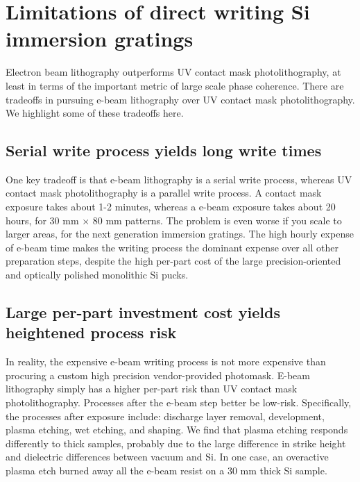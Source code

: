 \section{Limitations of direct writing Si immersion gratings}
Electron beam lithography outperforms UV contact mask photolithography, at least in terms of the important metric of large scale phase coherence.  There are tradeoffs in pursuing e-beam lithography over UV contact mask photolithography.  We highlight some of these tradeoffs here.

\subsection{Serial write process yields long write times}
One key tradeoff is that e-beam lithography is a serial write process, whereas UV contact mask photolithography is a parallel write process.  A contact mask exposure takes about 1-2 minutes, whereas a e-beam exposure takes about 20 hours, for 30 mm $\times$ 80 mm patterns.  The problem is even worse if you scale to larger areas, for the next generation immersion gratings.  The high hourly expense of e-beam time makes the writing process the dominant expense over all other preparation steps, despite the high per-part cost of the large precision-oriented and optically polished monolithic Si pucks.  

\subsection{Large per-part investment cost yields heightened process risk}
In reality, the expensive e-beam writing process is not more expensive than procuring a custom high precision vendor-provided photomask.  E-beam lithography simply has a higher per-part risk than UV contact mask photolithography.  Processes after the e-beam step better be low-risk.  Specifically, the processes after exposure include: discharge layer removal, development, plasma etching, wet etching, and shaping.  We find that plasma etching responds differently to thick samples, probably due to the large difference in strike height and dielectric differences between vacuum and Si.  In one case, an overactive plasma etch burned away all the e-beam resist on a 30 mm thick Si sample.

